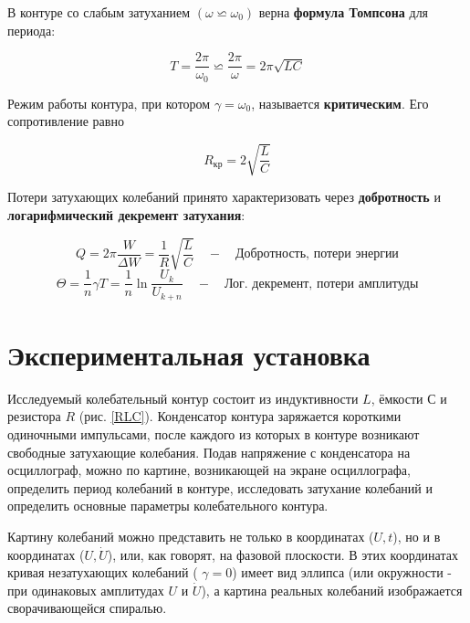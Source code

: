 \documentclass[a4paper, 12pt]{article}
\begin{document}
    В контуре со слабым затуханием $ (\omega \backsimeq \omega_0) $ верна \textbf{формула Томпсона} для периода: 

    \begin{equation}\label{}
    T = \dfrac{2\pi}{\omega_0} \backsimeq  \dfrac{2\pi}{\omega} = 2\pi\sqrt{LC}
    \end{equation}

    Режим работы контура, при котором $ \gamma = \omega_0 $, называется \textbf{критическим}. Его сопротивление равно 

    \begin{equation}\label{}
    R_{кр} = 2\sqrt{\dfrac{L}{C}}
    \end{equation}

    Потери затухающих колебаний принято характеризовать через \textbf{добротность} и \textbf{логарифмический декремент затухания}: 

    \begin{equation}\label{Q}
    Q = 2\pi \dfrac{W}{\Delta W} = \dfrac{1}{R} \sqrt{\dfrac{L}{C}} \quad - \quad \text{Добротность, потери энергии}
    \end{equation}
    \begin{equation}\label{theta}
    \Theta = \dfrac{1}{n} \gamma T = \dfrac{1}{n} \ln \dfrac{U_k}{U_{k+n}}  \quad - \quad \text{Лог. декремент, потери амплитуды}
    \end{equation}

    \section*{Экспериментальная установка}    
    
    Исследуемый колебательный контур состоит из индуктивности $ L $,
    ёмкости $ С $ и резистора $ R $ (рис. \ref{RLC}). Конденсатор контура заряжается
    короткими одиночными импульсами, после каждого из которых в контуре
    возникают свободные затухающие колебания. Подав напряжение
    с конденсатора на осциллограф, можно по картине, возникающей на
    экране осциллографа, определить период колебаний в контуре, исследовать
    затухание колебаний и определить основные параметры колебательного
    контура.

    Картину колебаний можно представить не только в координатах ($ U, t $), но и в координатах ($ U, \dot{U} $), или, как говорят, на фазовой
    плоскости. В этих координатах кривая незатухающих колебаний ( $ \gamma = 0 $)
    имеет вид эллипса (или окружности - при одинаковых амплитудах $ U $
    и $ \dot{U} $), а картина реальных колебаний изображается сворачивающейся
    спиралью. 
\end{document}
